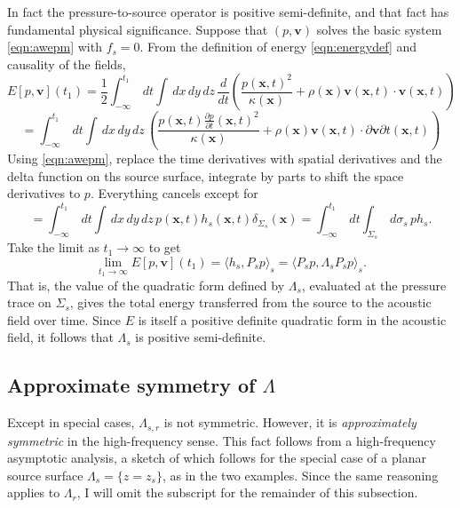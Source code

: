 \documentclass[12pt]{geophysics}
\newcommand{\bx}{\mathbf{x}}
\newcommand{\bv}{\mathbf{v}}
\begin{document}
In fact the pressure-to-source operator is positive semi-definite, and that
fact has fundamental physical significance. Suppose that $(p,\bv)$
solves the basic system \ref{eqn:awepm} with $f_s=0$. From the
definition of energy \ref{eqn:energydef} and causality of the fields,
\[
 E[p,\bv](t_1) = \frac{1}{2} \int_{-\infty}^{t_1} \,dt \int \,dx\,dy\,dz\,
 \frac{d}{dt}\left(\frac{p(\bx,t)^2}{\kappa(\bx)} +
   \rho(\bx)\bv(\bx,t) \cdot \bv(\bx,t)\right)
\]
\[
  = \int_{-\infty}^{t_1} \,dt \int \,dx\,dy\,dz\,
 \left(\frac{p (\bx,t)\frac{\partial p}{\partial t}(\bx,t)^2}{\kappa(\bx)} +
   \rho(\bx)\bv(\bx,t) \cdot \partial{\bv}{\partial t}(\bx,t)\right)
\]
Using \ref{eqn:awepm}, replace the time derivatives with spatial derivatives and the delta
function on ths source surface, integrate by parts to shift the space
derivatives to $p$. Everything cancels except for
\[
  =  \int_{-\infty}^{t_1} \,dt \int \,dx\,dy\,dz\, p(\bx,t) h_s(\bx,t)
  \delta_{\Sigma_s}(\bx) = \int_{-\infty}^{t_1} \,dt \int_{\Sigma_s} \,d\sigma_s \, p h_s.
\]
Take the limit as $t_1 \rightarrow \infty$ to get
\[
\lim_{t_1 \rightarrow \infty} E[p,\bv](t_1) = \langle h_s, P_s p \rangle_s = \langle P_s p, \Lambda_s P_s p \rangle_s. 
\]
That is, the value of the quadratic form defined by
$\Lambda_s$, evaluated at the pressure trace on $\Sigma_s$,
gives the total energy transferred from the source to the
acoustic field over time. Since $E$ is itself a positive definite
quadratic form in the acoustic field, it follows that $
\Lambda_s$ is positive semi-definite. 

\subsection{Approximate symmetry of $\Lambda$}
Except in special cases, $\Lambda_{s,r}$ is not
symmetric. However, it is {\em approximately symmetric} in the
high-frequency sense. This fact follows from a high-frequency
asymptotic analysis, a sketch of which follows for the special case of
a planar source surface
$\Lambda_s=\{z=z_s\}$, as in the two examples. Since the same reasoning
applies to $\Lambda_r$, I will omit the subscript for the remainder of
this subsection.
\end{document}
